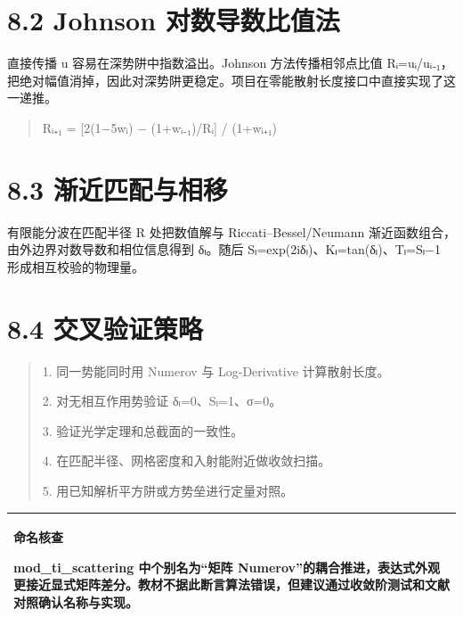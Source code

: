 \documentclass[UTF8,openany,11pt,fontset=fandol]{ctexbook}
\begin{document}
\section{\texorpdfstring{\textbf{8.2 Johnson
对数导数比值法}}{8.2 Johnson 对数导数比值法}}\label{johnson-ux5bf9ux6570ux5bfcux6570ux6bd4ux503cux6cd5}

直接传播 u 容易在深势阱中指数溢出。Johnson 方法传播相邻点比值
Rᵢ=uᵢ/uᵢ₋₁，把绝对幅值消掉，因此对深势阱更稳定。项目在零能散射长度接口中直接实现了这一递推。

\begin{quote}
Rᵢ₊₁ = {[}2(1−5wᵢ) − (1+wᵢ₋₁)/Rᵢ{]} / (1+wᵢ₊₁)
\end{quote}

\section{\texorpdfstring{\textbf{8.3
渐近匹配与相移}}{8.3 渐近匹配与相移}}\label{ux6e10ux8fd1ux5339ux914dux4e0eux76f8ux79fb}

有限能分波在匹配半径 R 处把数值解与 Riccati--Bessel/Neumann
渐近函数组合，由外边界对数导数和相位信息得到 δₗ。随后
Sₗ=exp(2iδₗ)、Kₗ=tan(δₗ)、Tₗ=Sₗ−1 形成相互校验的物理量。

\section{\texorpdfstring{\textbf{8.4
交叉验证策略}}{8.4 交叉验证策略}}\label{ux4ea4ux53c9ux9a8cux8bc1ux7b56ux7565}

\begin{quote}
1. 同一势能同时用 Numerov 与 Log-Derivative 计算散射长度。

2. 对无相互作用势验证 δₗ=0、Sₗ=1、σ=0。

3. 验证光学定理和总截面的一致性。

4. 在匹配半径、网格密度和入射能附近做收敛扫描。

5. 用已知解析平方阱或方势垒进行定量对照。
\end{quote}

\begin{longtable}[]{@{}l@{}}
\toprule
\endhead
\begin{minipage}[t]{0.97\columnwidth}\raggedright
\textbf{命名核查}

mod\_ti\_scattering 中个别名为``矩阵
Numerov''的耦合推进，表达式外观更接近显式矩阵差分。教材不据此断言算法错误，但建议通过收敛阶测试和文献对照确认名称与实现。\strut
\end{minipage}\tabularnewline
\bottomrule
\end{longtable}
\end{document}
